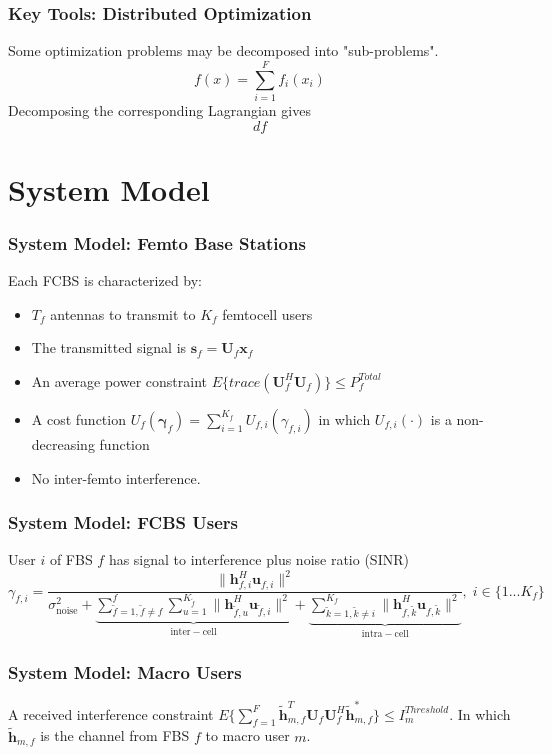 \documentclass[10pt,tgadventor, onlymath]{beamer}
\begin{document}
\begin{frame}
\frametitle{Key Tools: Distributed Optimization}
Some optimization problems may be decomposed into "sub-problems".
\begin{equation}
f(x) = \sum_{i = 1}^{F} f_{i}(x_{i})
\end{equation}
Decomposing the corresponding Lagrangian gives
\begin{equation}
df
\end{equation}
\end{frame}
%

\section{System Model}
\begin{frame}
\frametitle{System Model: Femto Base Stations}
Each FCBS is characterized by:
\\
\begin{itemize}
\item 
	$T_{f}$ antennas to transmit to $K_{f}$ femtocell users
\item 
	The transmitted 		
	signal is $\mathbf{s}_{f
	}= \mathbf{U}_{f}\mathbf{x}_{f}$
\item 
	An average power constraint $E\{trace(\mathbf{U}_{f}^H\mathbf{U}_{f})\} \leq P^{Total}_{f} $
\item 
	A cost function $U_{f}(\boldsymbol{\gamma}_{f}) =
	\sum_{i=1}^{K_{f}}
    	 U_{f,i}(\gamma_{f,i}) $
    	in which $U_{f,i}(\cdot)$ is a non-decreasing function
\item 
	No inter-femto interference.
\end{itemize}
\end{frame}

\begin{frame}
\frametitle{System Model: FCBS Users}
User $i$ of FBS $f$ has signal to interference plus noise ratio (SINR)
	\begin{equation*}
	\gamma_{f,i} = \frac{\|\mathbf{h}^H_{f,i}\mathbf{u}_{f,i}\|^2}
	{\sigma^2_{\text{noise}}   +
	\underbrace{
	 \sum_{\tilde{f}=1, \tilde{f}\neq f}^{f} \sum_{u=1}^{K_{\tilde{f}}}
	\|\mathbf{h}^H_{\tilde{f},u}\mathbf{u}_{\tilde{f},i}\|^2}_{\mathrm{inter-cell}}
	 + 
	 \underbrace{
	 \sum_{\tilde{k}=1, \tilde{k}\neq i}^{K_f}
	 \|\mathbf{h}^H_{f,\tilde{k}}\mathbf{u}_{f,\tilde{k}}\|^2}_{\mathrm{intra-cell}}},
	  \; i \in \{1 ... K_f\}
	  \end{equation*}
\end{frame}

\begin{frame}
\frametitle{System Model: Macro Users}
	A received interference constraint
	$E\{\sum^F_{f=1} \mathbf{\tilde{h}}_{m,f}^T  \mathbf{U}_{f}					
	\mathbf{U}_{f}^{H} \mathbf{\tilde{h}}_{m,f}^*\} \leq I^{Threshold}		
	_{m} $. In which $\mathbf{\tilde{h}}_{m,f}$ is the channel from FBS $f$ to macro user $m$.
\end{frame}
\end{document}
